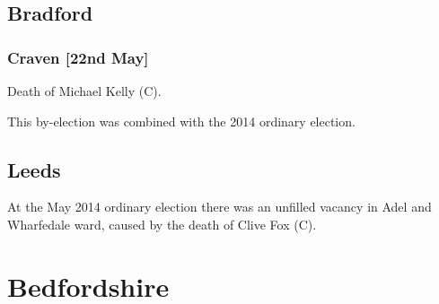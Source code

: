 \documentclass[a4paper,openany]{book}
\begin{document}
\begin{results}

\subsection*{Bradford}

\subsubsection*{Craven \hspace*{\fill}\nolinebreak[1]%
\enspace\hspace*{\fill}
[22nd May]}


Death of Michael Kelly (C).

This by-election was combined with the 2014 ordinary election.

\subsection*{Leeds}

At the May 2014 ordinary election there was an unfilled vacancy in Adel and Wharfedale ward, caused by the death of Clive Fox (C).

\end{results}

\section{Bedfordshire}
\end{document}

